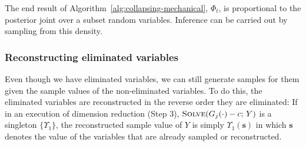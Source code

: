 \documentclass[]{article}
\newcommand{\bvec}[1]{\textbf{#1}}
\begin{document}
The end result of Algorithm~\ref{alg:collapsing-mechanical}, $\Phi_t$, is proportional to
the posterior joint over a subset random variables.
Inference can be carried out by sampling from this density.

\subsubsection{Reconstructing eliminated variables}

Even though we have eliminated variables, 
we can still generate samples for them given the sample values of the non-eliminated variables. 
To do this, the  eliminated variables are reconstructed in the reverse order they are eliminated:
If in an execution of dimension reduction (Step 3), 
{\footnotesize$\textsc{Solve}(G_j(\cdot)-c ;\, Y)$} is a singleton
{\footnotesize$\{\Upsilon_1\}$},
the reconstructed sample value of $Y$ is simply 
{\footnotesize$\Upsilon_1(\bvec{s})$} 
in which $\bvec{s}$ denotes the value of the variables that are already sampled or reconstructed. 
\end{document}
